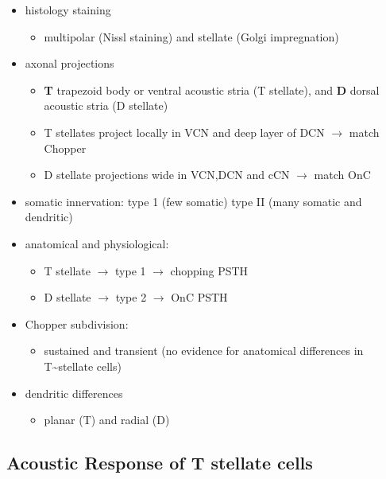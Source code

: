 \begin{itemize}
\item histology staining
\begin{itemize}
\item multipolar (Nissl staining) and stellate (Golgi impregnation) \citep{Osen:1969,BrawerMorestEtAl:1974,Lorente:1981}
\end{itemize}
\item axonal projections
\begin{itemize}
\item \textbf{T} trapezoid body or ventral acoustic stria (T stellate), and \textbf{D} dorsal acoustic stria (D stellate) \citep{OertelWuEtAl:1990}
\item T stellates project locally in VCN and deep layer of DCN $\rightarrow$ match Chopper \citep{RhodeOertelEtAl:1983,SmithRhode:1989}
\item D stellate projections wide in VCN,DCN and cCN $\rightarrow$ match OnC  \citep{SmithRhode:1989}
\end{itemize}
\item somatic innervation: type 1 (few somatic) type II (many somatic and dendritic) \citep{Cant:1981}
\item anatomical and physiological: \citet{SmithRhode:1989}
\begin{itemize}
\item T stellate $\rightarrow$ type 1 $\rightarrow$ chopping PSTH
\item D stellate $\rightarrow$ type 2 $\rightarrow$ OnC PSTH
\end{itemize}
\item Chopper subdivision:
\begin{itemize}
\item sustained and transient (no evidence for anatomical differences in T\~{}stellate cells)
\end{itemize}
\item dendritic differences \citep{DoucetRyugo:1997,DoucetRyugo:2006}
\begin{itemize}
\item planar (T) and radial (D)
\end{itemize}
\end{itemize}

\subsection{Acoustic Response of T stellate cells}
\label{sec-1_2}



